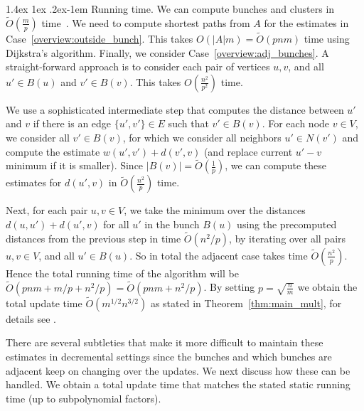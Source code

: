 \documentclass[11pt]{article}
\makeatletter
\theoremstyle{definition}
\theoremstyle{remark}
\newcommand{\ttodo}[1]{\todo[color=orange!20]{T: #1}}
\newcommand{\mtodo}[1]{\todo[color=red!20]{M: #1}}
\renewcommand{\paragraph}{%
  \@startsection{paragraph}{4}%
  {\z@}{1.4ex \@plus 1ex \@minus .2ex}{-1em}%
  {\normalfont\normalsize\bfseries}%
}
\makeatother
\begin{document}
\begin{titlepage}
\paragraph{Running time.} 
We can compute bunches and clusters in $\tilde O(\tfrac{m}{p})$ time~\cite{TZ2005}. We need to compute shortest paths from $A$ for the estimates in Case~\ref{overview:outside_bunch}. This takes $O(|A|m)=\tilde O(pnm)$ time using Dijkstra's algorithm. Finally, we consider Case~\ref{overview:adj_bunches}. A straight-forward approach is to consider each pair of vertices $u,v$, and all $u'\in B(u)$ and $v'\in B(v)$. This takes $O(\tfrac{n^2}{p^2})$ time. 

We use a sophisticated intermediate step that computes the distance between $u'$ and $v$ if there is an edge $\{u',v'\}\in E$ such that $v'\in B(v)$. For each node $v \in V$, we consider all $v'\in B(v)$, for which we consider all neighbors $u'\in N(v')$ and compute the estimate $w(u',v')+d(v',v)$ (and replace current $u'-v$ minimum if it is smaller). Since $|B(v)|=\tilde O(\tfrac{1}{p})$, we can compute these estimates for $d(u',v)$ in $\tilde O(\tfrac{n^2}{p})$ time. 

Next, for each pair $u,v\in V$, we take the minimum over the distances $d(u,u')+d(u',v)$ for all $u'$ in the bunch $B(u)$ using the precomputed distances from the previous step in time $\tilde O(n^2/p)$, by iterating over all pairs $u,v\in V$, and all $u'\in B(u)$. 
So in total the adjacent case takes time $\tilde O(\tfrac{n^2}{p})$. Hence the total running time of the algorithm will be $\tilde O(pnm+m/p+n^2/p)=\tilde O(pnm+n^2/p)$. By setting $p=\sqrt{\tfrac{n}{m}}$ we obtain the total update time $\tilde O(m^{1/2}n^{3/2})$ as stated in Theorem~\ref{thm:main_mult}, for details see .


There are several subtleties that make it more difficult to maintain these estimates in decremental settings since the bunches and which bunches are adjacent keep on changing over the updates. We next discuss how these can be handled. We obtain a total update time that matches the stated static running time (up to subpolynomial factors). %


\end{titlepage}
\end{document}
